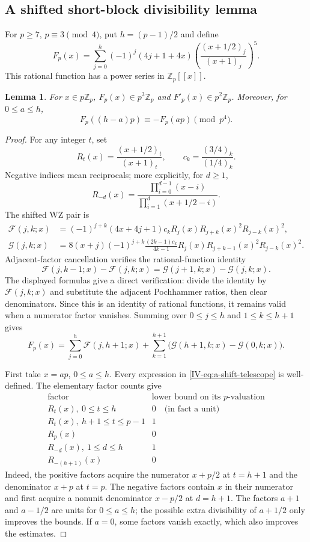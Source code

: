 \documentclass[11pt,letterpaper]{article}
\newtheorem{lemma}[theorem]{Lemma}
\numberwithin{equation}{section}
\begin{document}
\subsection{A shifted short-block divisibility lemma}
For $p\ge7$, $p\equiv3\pmod4$, put $h=(p-1)/2$ and define
\[
 F_p(x)=\sum_{j=0}^{h}(-1)^j(4j+1+4x)
       \left(\frac{(x+1/2)_j}{(x+1)_j}\right)^5.
\]
This rational function has a power series in $\mathbb Z_p[[x]]$.
\begin{lemma}\label{IV-lem:a-shifted-block}
For $x\in p\mathbb Z_p$, $F_p(x)\in p^3\mathbb Z_p$ and
$F'_p(x)\in p^2\mathbb Z_p$. Moreover, for $0\le a\le h$,
\[
 F_p((h-a)p)\equiv-F_p(ap)\pmod{p^4}.
\]
\end{lemma}
\begin{proof}
For any integer $t$, set
\[
 R_t(x)=\frac{(x+1/2)_t}{(x+1)_t},\qquad
 c_k=\frac{(3/4)_k}{(1/4)_k}.
\]
Negative indices mean reciprocals; more explicitly, for $d\ge1$,
\[
 R_{-d}(x)=\frac{\prod_{i=0}^{d-1}(x-i)}
                       {\prod_{i=1}^{d}(x+1/2-i)}.
\]
The shifted WZ pair is
\begin{align*}
 \mathcal F(j,k;x)&=(-1)^{j+k}(4x+4j+1)c_k
               R_j(x)R_{j+k}(x)^2R_{j-k}(x)^2,\\
 \mathcal G(j,k;x)&=8(x+j)(-1)^{j+k}
       \frac{(2k-1)c_k}{4k-1}
       R_j(x)R_{j+k-1}(x)^2R_{j-k}(x)^2.
\end{align*}
Adjacent-factor cancellation verifies the rational-function identity
\[
 \mathcal F(j,k-1;x)-\mathcal F(j,k;x)
 =\mathcal G(j+1,k;x)-\mathcal G(j,k;x).
\]
The displayed formulas give a direct verification: divide the
identity by $\mathcal F(j,k;x)$ and substitute the adjacent
Pochhammer ratios, then clear denominators. Since this is an identity
of rational functions, it remains valid when a numerator factor
vanishes. Summing over $0\le j\le h$ and $1\le k\le h+1$ gives
\begin{equation}\label{IV-eq:a-shift-telescope}
 F_p(x)=\sum_{j=0}^{h}\mathcal F(j,h+1;x)
       +\sum_{k=1}^{h+1}\bigl(\mathcal G(h+1,k;x)-
                              \mathcal G(0,k;x)\bigr).
\end{equation}

First take $x=ap$, $0\le a\le h$. Every expression in
\eqref{IV-eq:a-shift-telescope} is well-defined. The elementary factor
counts give
\[
\begin{array}{c|c}
\text{factor}&\text{lower bound on its }p\text{-valuation}\\ \hline
R_t(x),\ 0\le t\le h&0\quad\text{(in fact a unit)}\\
R_t(x),\ h+1\le t\le p-1&1\\
R_p(x)&0\\
R_{-d}(x),\ 1\le d\le h&1\\
R_{-(h+1)}(x)&0
\end{array}
\]
Indeed, the positive factors acquire the numerator $x+p/2$ at
$t=h+1$ and the denominator $x+p$ at $t=p$. The negative factors
contain $x$ in their numerator and first acquire a nonunit denominator
$x-p/2$ at $d=h+1$. The factors $a+1$ and $a-1/2$ are units for
$0\le a\le h$; the possible extra divisibility of $a+1/2$ only
improves the bounds. If $a=0$, some factors vanish exactly, which
also improves the estimates.


\end{proof}
\end{document}

